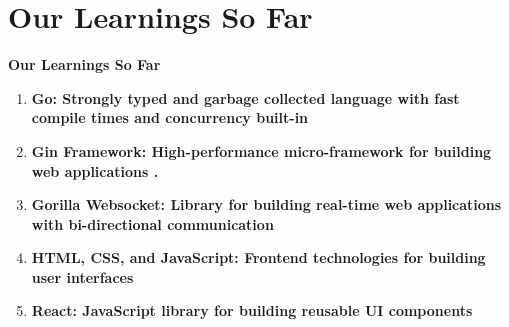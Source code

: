 \documentclass{beamer}
\begin{document}
\section{Our Learnings So Far}

\begin{frame}{\bfseries Our Learnings So Far}
    \begin{enumerate}
        \item \bfseries Go: Strongly typed and garbage collected language with fast compile times and concurrency built-in
        \item \bfseries Gin Framework: High-performance micro-framework for building web applications .
        \item \bfseries Gorilla Websocket: Library for building real-time web applications with bi-directional communication
        \item \bfseries HTML, CSS, and JavaScript: Frontend technologies for building user interfaces
        \item \bfseries React: JavaScript library for building reusable UI components
    \end{enumerate}
\end{frame}

\begin{frame}{ }
    \begin{center}
        \LARGE
    \end{center}
\end{frame}
\end{document}
